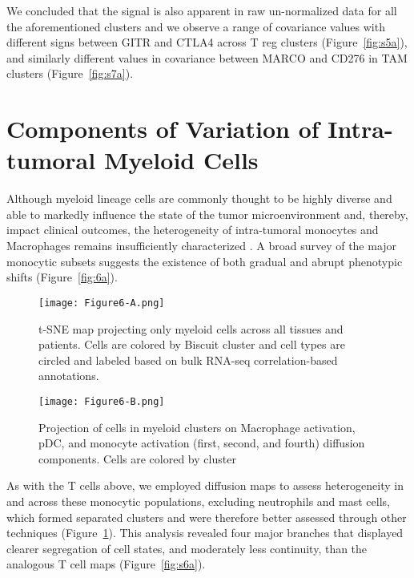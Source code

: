 We concluded that the signal is also apparent in raw un-normalized data for all the aforementioned clusters and we observe a range of covariance values with different signs between GITR and CTLA4 across T reg clusters (Figure~\ref{fig:s5a}), and similarly different values in covariance between MARCO and CD276 in TAM clusters (Figure~\ref{fig:s7a}).

\section{Components of Variation of Intra-tumoral Myeloid Cells}

Although myeloid lineage cells are commonly thought to be highly diverse and able to markedly influence the state of the tumor microenvironment and, thereby, impact clinical outcomes, the heterogeneity of intra-tumoral monocytes and Macrophages remains insufficiently characterized \citep{Campbell2011,DeHenau2016,Engblom2016,Eppert2011,Gholamin2017,Pyonteck2013}.
A broad survey of the major monocytic subsets suggests the existence of both gradual and abrupt phenotypic shifts (Figure~\ref{fig:6a}).

\begin{figure}
\begin{minipage}{.5\textwidth}
  \centering
  \texttt{[image: Figure6-A.png]}
  \caption{t-SNE map projecting only myeloid cells across all tissues and patients. Cells are colored by Biscuit cluster and cell types are circled and labeled based on bulk RNA-seq correlation-based annotations.}
  \label{fig:6a}
\end{minipage}
\begin{minipage}{.5\textwidth}
  \centering
  \texttt{[image: Figure6-B.png]}
  \caption{Projection of cells in myeloid clusters on Macrophage activation, pDC, and monocyte activation (first, second, and fourth) diffusion components. Cells are colored by cluster}
  \label{fig:6b}
\end{minipage}
\end{figure}

As with the T cells above, we employed diffusion maps to assess heterogeneity in and across these monocytic populations, excluding neutrophils and mast cells, which formed separated clusters and were therefore better assessed through other techniques (Figure~\ref{fig:6b}).
This analysis revealed four major branches that displayed clearer segregation of cell states, and moderately less continuity, than the analogous T cell maps (Figure~\ref{fig:s6a}).

